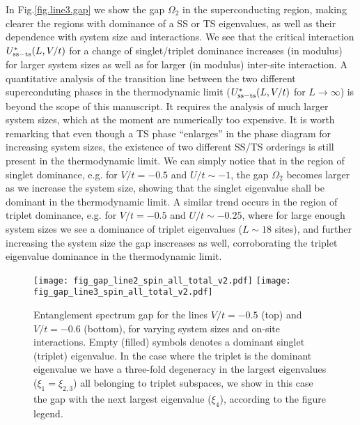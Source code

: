 \documentclass[prb,reprint,showpacs,twocolumn,superscriptaddress]{revtex4-2}
\begin{document}
In Fig.\eqref{fig.line3.gap} we show the gap $\Omega_2$ in the superconducting region, making clearer the regions with dominance of a SS or TS eigenvalues, as well as their dependence with system size and interactions.  We see that 
the critical interaction 
$U^*_{\rm{ss-ts}}(L,V/t)$ for a change of singlet/triplet dominance 
increases (in modulus) for larger system sizes as well as for larger (in modulus) inter-site interaction. A quantitative analysis of the transition line between the two different superconduting phases in the thermodynamic limit ($U^*_{\rm{ss-ts}}(L,V/t)$ for $L \rightarrow \infty$) is beyond the scope of this manuscript. It requires the analysis of much larger system sizes, which at the moment are numerically too expensive. It is worth remarking that even though a TS phase ``enlarges'' in the phase diagram for increasing system sizes, the existence of two different SS/TS orderings is still present in the thermodynamic limit. We can simply notice that in the region of singlet dominance,  e.g. for $V/t=-0.5$ and $U/t \sim -1 $, the gap $\Omega_2$ becomes larger as we increase the system size, showing that the singlet eigenvalue shall be dominant in the thermodynamic limit. A similar trend occurs in the region of triplet dominance,  e.g. for $V/t=-0.5$ and $U/t \sim -0.25 $, where for large enough system sizes we see a dominance of triplet eigenvalues ($L \sim 18$ sites), and further increasing the system size the gap inscreases as well, corroborating the triplet eigenvalue dominance in the thermodynamic limit.

\begin{figure}
\texttt{[image: fig\_gap\_line2\_spin\_all\_total\_v2.pdf]}
\texttt{[image: fig\_gap\_line3\_spin\_all\_total\_v2.pdf]}
\caption{ Entanglement spectrum gap for the lines $V/t=-0.5$ (top) and $V/t=-0.6$ (bottom), for varying system sizes and on-site interactions. 
Empty (filled) symbols denotes a dominant singlet (triplet) eigenvalue. In the case where the triplet is the dominant eigenvalue  we have a three-fold degeneracy in the largest eigenvalues ($\xi_{1} = \xi_{2,3}$) all belonging to triplet subspaces, we show in this case the gap with the next largest eigenvalue ($\xi_4$), according to the figure legend.}
\label{fig.line3.gap}
\end{figure}
\end{document}
